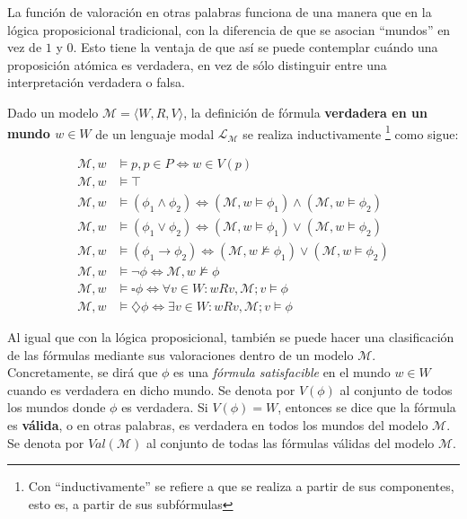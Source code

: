 La función de valoración en otras palabras funciona de una manera que en la lógica proposicional tradicional, con la diferencia de que se asocian ``mundos'' en vez de $1$ y $0$. Esto tiene la ventaja de que así se puede contemplar cuándo una proposición atómica es verdadera, en vez de sólo distinguir entre una interpretación verdadera o falsa.

Dado un modelo $\mathcal{M} = \langle W,R,V \rangle$, la definición de fórmula \textbf{verdadera en un mundo $w \in W$} de un lenguaje modal $\mathcal{L}_{\mathcal{M}}$ se realiza inductivamente \footnote{Con ``inductivamente'' se refiere a que se realiza a partir de sus componentes, esto es, a partir de sus subfórmulas} como sigue:

\begin{align*}
    \mathcal{M},w &\models p, p \in P \Leftrightarrow w \in V(p) \\
    \mathcal{M},w &\models \top \\
    \mathcal{M},w &\models (\phi_1 \land \phi_2) \Leftrightarrow (\mathcal{M},w \models \phi_1) \land (\mathcal{M},w \models \phi_2)  \\
    \mathcal{M},w &\models (\phi_1 \lor \phi_2) \Leftrightarrow (\mathcal{M},w \models \phi_1) \lor (\mathcal{M},w \models \phi_2)\\
    \mathcal{M},w &\models (\phi_1 \rightarrow \phi_2) \Leftrightarrow (\mathcal{M},w \not \models \phi_1) \lor (\mathcal{M},w \models \phi_2) \\
    \mathcal{M},w &\models \neg \phi \Leftrightarrow \mathcal{M},w \not \models \phi \\
    \mathcal{M},w &\models \square \phi \Leftrightarrow \forall v \in W : wRv, \mathcal{M}; v \models \phi\\
    \mathcal{M},w &\models \diamondsuit \phi \Leftrightarrow \exists v \in W : wRv, \mathcal{M}; v \models \phi
\end{align*}

Al igual que con la lógica proposicional, también se puede hacer una clasificación de las fórmulas mediante sus valoraciones dentro de un modelo $\mathcal{M}$. Concretamente, se dirá que $\phi$ es una \textit{fórmula satisfacible} en el mundo $w \in W$ cuando es verdadera en dicho mundo. Se denota por $V(\phi)$ al conjunto de todos los mundos donde $\phi$ es verdadera. Si $V(\phi) = W$, entonces se dice que la fórmula es \textbf{válida}, o en otras palabras, es verdadera en todos los mundos del modelo $\mathcal{M}$. Se denota por $Val(\mathcal{M})$ al conjunto de todas las fórmulas válidas del modelo $\mathcal{M}$.

